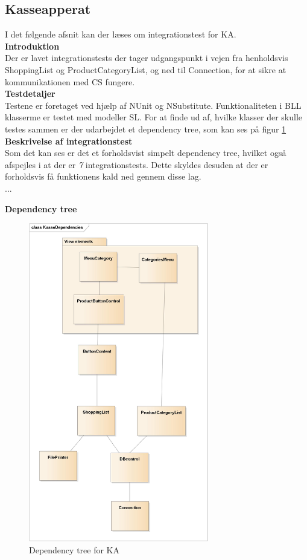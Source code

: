  \subsection{Kasseapperat}
I det følgende afsnit kan der læses om integrationstest for \gls{KA}.\\

\textbf{Introduktion}\\
Der er lavet integrationstests der tager udgangspunkt i vejen fra henholdsvis ShoppingList og ProductCategoryList, og ned til Connection, for at sikre at kommunikationen med \gls{CS} fungere.\\

\textbf{Testdetaljer}\\
Testene er foretaget ved hjælp af NUnit og NSubstitute. Funktionaliteten i BLL klasserme er testet med modeller \gls{SL}. For at finde ud af, hvilke klasser der skulle testes sammen er der udarbejdet et dependency tree, som kan ses på figur \ref{fig:KA-dependencies}\\

\textbf{Beskrivelse af integrationstest}\\
Som det kan ses er det et forholdsvist simpelt dependency tree, hvilket også afspejles i at der er \textit{7} integrationstests. Dette skyldes desuden at der er forholdsvis få funktionens kald ned gennem disse lag.\\
... %

\textbf{Dependency tree}
\begin{figure}[H]
	\centering
	\includegraphics[width=0.7\textwidth]{Test/Integrationstest/Images/KasseDependencies}
	\caption{Dependency tree for \gls{KA}}
	\label{fig:KA-dependencies}
\end{figure}
